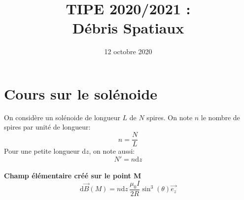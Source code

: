 \documentclass[a4paper,1pt]{article}
\title{TIPE 2020/2021 : \\ Débris Spatiaux}
\date{12 octobre 2020}
\begin{document}
\maketitle

\section*{Cours sur le solénoide}
On considère un solénoide de longueur $L$ de $N$ spires. On note $n$ le nombre de spires par unité de longueur:
$$n= \frac{N}{L}$$
Pour une petite longueur d$z$, on note aussi:
$$N'=n\mathrm{d}z$$
\\
\textbf{Champ élémentaire créé sur le point M}
$$\mathrm{d} \overset{\to}{B}(M) = n\mathrm{d}z\, \frac{\mu_0 I}{2 R} \sin^3(\theta) \overset{\to}{e_z}$$
\end{document}
